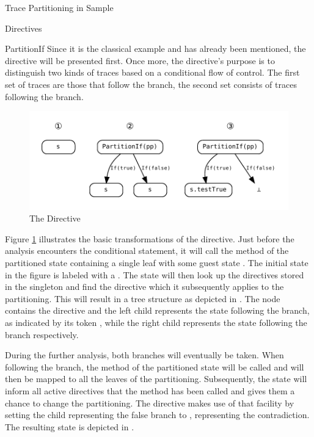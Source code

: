 \begin{chapter}{Trace Partitioning in Sample}
\begin{section}{Directives}

		\begin{subsection}{PartitionIf}
			Since it is the classical example and has already been mentioned, the  directive will be presented first. Once more, the directive's purpose is to distinguish two kinds of traces based on a conditional flow of control. The first set of traces are those that follow the  branch, the second set consists of traces following the  branch.

			\begin{figure}
				\centering
				\includegraphics[]{Graphs/PartitionIf.pdf}
				\caption{The  Directive}
				\label{figure:PartitionIf}
			\end{figure}

			Figure \ref{figure:PartitionIf} illustrates the basic transformations of the directive. Just before the analysis encounters the conditional statement, it will call the  method of the partitioned state containing a single leaf with some guest state . The initial state in the figure is labeled with a \one. The state will then look up the directives stored in the  singleton and find the  directive which it subsequently applies to the partitioning. This will result in a tree structure as depicted in \two. The node contains the directive and the left child represents the state following the  branch, as indicated by its token , while the right child represents the state following the  branch respectively. 

			During the further analysis, both branches will eventually be taken. When following the  branch, the  method of the partitioned state will be called and will then be mapped to all the leaves of the partitioning. Subsequently, the state will inform all active directives that the  method has been called and gives them a chance to change the partitioning. The  directive makes use of that facility by setting the child representing the false branch to , representing the contradiction. The resulting state is depicted in \three.


\end{subsection}
\end{section}
\end{chapter}
